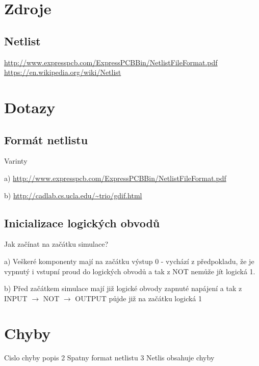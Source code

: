 \documentclass[11pt,a4paper]{article}
\author{Stanislav Nechutný}
\begin{document}
	\section{Zdroje}

		\subsection{Netlist}


			\url{http://www.expresspcb.com/ExpressPCBBin/NetlistFileFormat.pdf} \\
			\url{https://en.wikipedia.org/wiki/Netlist}

	\section{Dotazy}

		\subsection{Formát netlistu}

			Varinty

				a) \url{http://www.expresspcb.com/ExpressPCBBin/NetlistFileFormat.pdf}

				b) \url{http://cadlab.cs.ucla.edu/~trio/gdif.html}

		\subsection{Inicializace logických obvodů}

			Jak začínat na začátku simulace?

				a) Veškeré komponenty mají na začátku výstup 0 - vychází z předpokladu, že je vypnutý i vstupní proud do logických obvodů a tak z NOT nemůže jít logická 1.

				b) Před začátkem simulace mají již logické obvody zapnuté napájení a tak z INPUT $\rightarrow$ NOT $\rightarrow$ OUTPUT půjde již na začátku logická 1

	\section{Chyby}

		Cislo chyby	popis
		2		Spatny format netlistu
		3		Netlis obsahuje chyby
\end{document}
